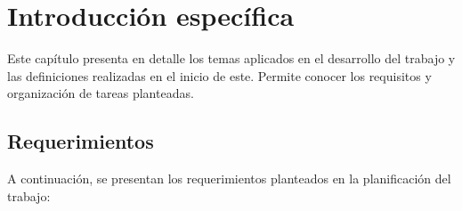 \chapter{Introducción específica} %

\label{Chapter2}


Este capítulo presenta en detalle los temas aplicados en el desarrollo del trabajo y las definiciones realizadas en el inicio de este. Permite conocer los requisitos y organización de tareas planteadas.




\section{Requerimientos}
\label{sec:requerimientos}

A continuación,  se presentan los requerimientos planteados en la planificación del trabajo:

